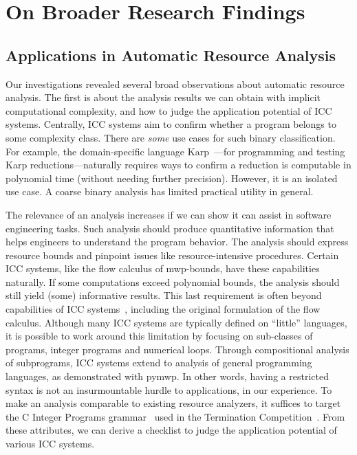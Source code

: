 \section{On Broader Research Findings}
\label{sec:broader-findings}

\subsection{Applications in Automatic Resource Analysis}
\label{subsec:res-resource-analysis}

Our investigations revealed several broad observations about automatic resource analysis.
The first is about the analysis results we can obtain with implicit computational complexity, and how to judge the application potential of ICC systems.
Centrally, ICC systems aim to confirm whether a program belongs to some complexity class.
There are \emph{some} use cases for such binary classification.
For example, the domain-specific language Karp~\cite{zhang2022}---for programming and testing Karp reductions---naturally requires ways to confirm a reduction is computable in polynomial time (without needing further precision).
However, it is an isolated use case. 
A coarse binary analysis has limited practical utility in general.

The relevance of an analysis increases if we can show it can assist in software engineering tasks.
Such analysis should produce quantitative information that helps engineers to understand the program behavior.
The analysis should express resource bounds and pinpoint issues like resource-intensive procedures.
Certain ICC systems, like the flow calculus of mwp-bounds, have these capabilities naturally.
If some computations exceed polynomial bounds, the analysis should still yield (some) informative results.
This last requirement is often beyond capabilities of ICC systems~\cite{baillot2012}, including the original formulation of the flow calculus.
Although many ICC systems are typically defined on \enquote{little} languages, it is possible to work around this limitation by focusing on sub-classes of programs, \eg integer programs and numerical loops.
Through compositional analysis of subprograms, ICC systems extend to analysis of general programming languages, as demonstrated with pymwp.
In other words, having a restricted syntax is not an insurmountable hurdle to applications, in our experience.
To make an analysis comparable to existing resource analyzers, it suffices to target the C Integer Programs grammar~\cite{cinteger} used in the Termination Competition~\cite{giesl2019}.
From these attributes, we can derive a checklist to judge the application potential of various ICC systems. 

